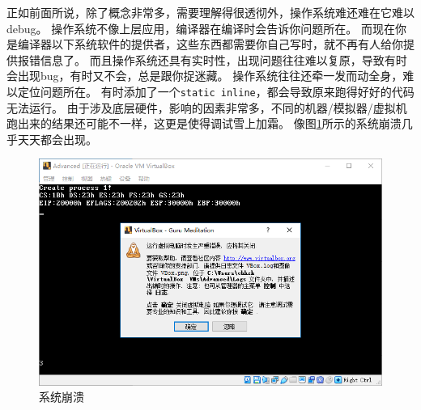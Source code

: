 \documentclass[logo,reportComp]{thesis}
\begin{document}
正如前面所说，除了概念非常多，需要理解得很透彻外，操作系统难还难在它难以debug。
操作系统不像上层应用，编译器在编译时会告诉你问题所在。
而现在你是编译器以下系统软件的提供者，这些东西都需要你自己写时，就不再有人给你提供报错信息了。
而且操作系统还具有实时性，出现问题往往难以复原，导致有时会出现bug，有时又不会，总是跟你捉迷藏。
操作系统往往还牵一发而动全身，难以定位问题所在。
有时添加了一个\verb'static inline'，都会导致原来跑得好好的代码无法运行。
由于涉及底层硬件，影响的因素非常多，不同的机器/模拟器/虚拟机跑出来的结果还可能不一样，这更是使得调试雪上加霜。
像图\ref{fig:break_down}所示的系统崩溃几乎天天都会出现。
\begin{figure}[H]
\centering
\includegraphics[width=0.8\linewidth]{fig/break_down.PNG}
\caption{系统崩溃}
\label{fig:break_down}
\end{figure}
\end{document}
